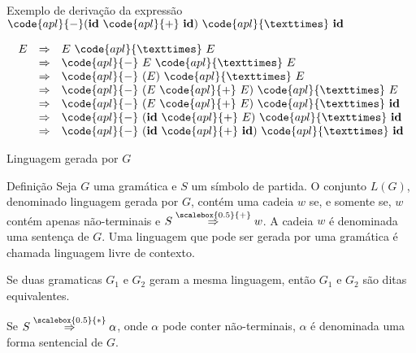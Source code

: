 \begin{frame}[fragile]{Exemplo de derivação da expressão $\code{apl}{-}(\textbf{id}\ \code{apl}{+}\ \textbf{id})\ \code{apl}{×}\ \textbf{id}$}

\[
    \begin{array}{rcl}
        E & \Rightarrow & E\ \code{apl}{×}\ E \\
          & \Rightarrow & \code{apl}{-}\ E\ \code{apl}{×}\ E\\
          & \Rightarrow & \code{apl}{-}\ (E)\ \code{apl}{×}\ E\\
          & \Rightarrow & \code{apl}{-}\ (E\ \code{apl}{+}\ E)\ \code{apl}{×}\ E\\
          & \Rightarrow & \code{apl}{-}\ (E\ \code{apl}{+}\ E)\ \code{apl}{×}\ \textbf{id}\\
          & \Rightarrow & \code{apl}{-}\ (\textbf{id}\ \code{apl}{+}\ E)\ \code{apl}{×}\ \textbf{id}\\
          & \Rightarrow & \code{apl}{-}\ (\textbf{id}\ \code{apl}{+}\ \textbf{id})\ \code{apl}{×}\ \textbf{id}
    \end{array}
\]

\end{frame}

\begin{frame}[fragile]{Linguagem gerada por $G$}

    \begin{block}{Definição}
        Seja $G$ uma gramática e $S$ um símbolo de partida. O conjunto $L(G)$, denominado linguagem gerada por $G$, contém uma cadeia $w$ se, e somente se,
            $w$ contém apenas não-terminais e 
            $S \overset{\scalebox{0.5}{+}}{\Rightarrow} w$. A cadeia $w$ é denominada uma sentença de $G$. Uma linguagem que pode ser gerada por uma gramática é
            chamada linguagem livre de contexto.

            \vspace{0.1in}

            Se duas gramaticas $G_1$ e $G_2$ geram a mesma linguagem, então $G_1$ e $G_2$ são ditas equivalentes.

            \vspace{0.1in}

            Se $S \overset{\scalebox{0.5}{*}}{\Rightarrow} \alpha$, onde $\alpha$ pode conter não-terminais, $\alpha$ é denominada uma forma sentencial de $G$.
    \end{block}

\end{frame}

